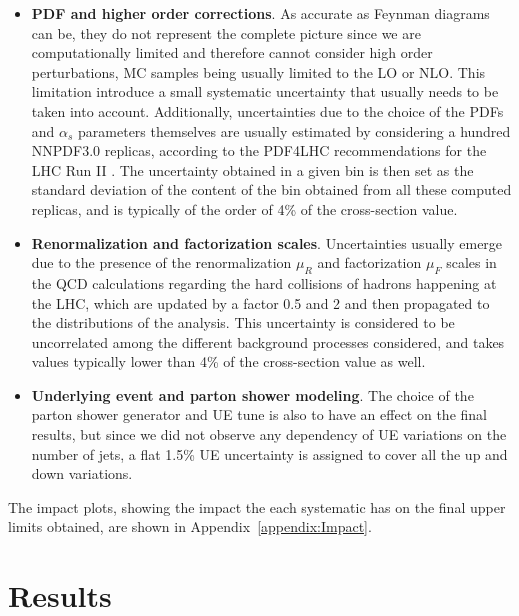 \documentclass[a4paper, 10pt, openright]{report}
\begin{document}
\begin{itemize}
\item \textbf{PDF and higher order corrections}. As accurate as Feynman diagrams can be, they do not represent the complete picture since we are computationally limited and therefore cannot consider high order perturbations, \ac{MC} samples being usually limited to the \acf{LO} or \acf{NLO}. This limitation introduce a small systematic uncertainty that usually needs to be taken into account. Additionally, uncertainties due to the choice of the \acp{PDF} and $\alpha_s$ parameters themselves are usually estimated by considering a hundred NNPDF3.0 \cite{NNPDF} replicas, according to the PDF4LHC recommendations for the \ac{LHC} Run II \cite{PDF4LHC}. The uncertainty obtained in a given bin is then set as the standard deviation of the content of the bin obtained from all these computed replicas, and is typically of the order of 4\% of the cross-section value.
\item \textbf{Renormalization and factorization scales}. Uncertainties usually emerge due to the presence of the renormalization $\mu_R$ and factorization $\mu_F$ scales in the QCD calculations regarding the hard collisions of hadrons happening at the \ac{LHC}, which are updated by a factor 0.5 and 2 and then propagated to the distributions of the analysis. This uncertainty is considered to be uncorrelated among the different background processes considered, and takes values typically lower than 4\% of the cross-section value as well.
\item \textbf{Underlying event and parton shower modeling}. The choice of the parton shower generator and \ac{UE} tune is also to have an effect on the final results, but since we did not observe any dependency of \ac{UE} variations on the number of jets, a flat 1.5\% \ac{UE} uncertainty is assigned to cover all the up and down variations.
\end{itemize}

The impact plots, showing the impact the each systematic has on the final upper limits obtained, are shown in Appendix~\ref{appendix:Impact}.


\section{Results} \label{section:Results}
\end{document}
